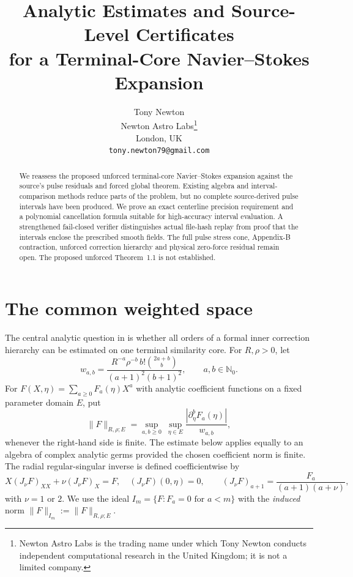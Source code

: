 \documentclass[11pt]{article}
\title{Analytic Estimates and Source-Level Certificates\\for a Terminal-Core Navier--Stokes Expansion}
\author{Tony Newton\\Newton Astro Labs\thanks{Newton Astro Labs is the trading name under which Tony Newton conducts independent computational research in the United Kingdom; it is not a limited company.}\\London, UK\\\texttt{tony.newton79@gmail.com}}
\date{}
\begin{document}
\maketitle
\begin{abstract}
We reassess the proposed unforced terminal-core Navier--Stokes expansion
against the source's pulse residuals and forced global theorem. Existing
algebra and interval-comparison methods reduce parts of the problem,
but no complete source-derived pulse intervals have been produced.
We prove an exact centerline precision requirement and a polynomial
cancellation formula suitable for high-accuracy interval evaluation.
A strengthened fail-closed verifier distinguishes actual file-hash
replay from proof that the intervals enclose the prescribed smooth
fields. The full pulse stress cone, Appendix-B contraction, unforced
correction hierarchy and physical zero-force residual remain open.
The proposed unforced Theorem~1.1 is not established.
\end{abstract}

\section{The common weighted space}
The central analytic question in \cite{newton2026} is whether all orders of a formal inner correction hierarchy can be estimated on one terminal similarity core. For $R,\rho>0$, let
\begin{equation}\label{eq:weight}
 w_{a,b}=\frac{R^{-a}\rho^{-b}\,b!\binom{2a+b}{b}}{(a+1)^2(b+1)^2},
 \qquad a,b\in\mathbb N_0.
\end{equation}
For $F(X,\eta)=\sum_{a\ge0}F_a(\eta)X^a$ with analytic coefficient functions on a fixed parameter domain $E$, put
\begin{equation}\label{eq:norm}
 \|F\|_{R,\rho;E}=\sup_{a,b\ge0}\ \sup_{\eta\in E}
 \frac{|\partial_\eta^b F_a(\eta)|}{w_{a,b}},
\end{equation}
whenever the right-hand side is finite. The estimate below applies equally to an algebra of complex analytic germs provided the chosen coefficient norm is finite. The radial regular-singular inverse is defined coefficientwise by
\begin{equation}\label{eq:radinv}
 X(J_\nu F)_{XX}+\nu(J_\nu F)_X=F,\quad (J_\nu F)(0,\eta)=0,
 \qquad (J_\nu F)_{a+1}=\frac{F_a}{(a+1)(a+\nu)},
\end{equation}
with $\nu=1$ or $2$. We use the ideal $I_m=\{F:F_a=0\text{ for }a<m\}$ with the \emph{induced} norm $\|F\|_{I_m}:=\|F\|_{R,\rho;E}$.
\end{document}
